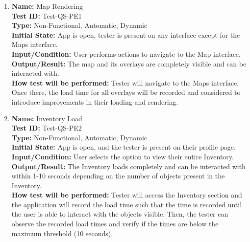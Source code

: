 \documentclass[12pt, titlepage]{article}
\begin{document}
\begin{enumerate}

  \item \textbf{Name:} Map Rendering \label{itm:Test-QS-PE1} \\
    \textbf{Test ID:} Test-QS-PE1 \\
    \textbf{Type:} Non-Functional, Automatic, Dynamic \\
    \textbf{Initial State:} App is open, tester is present on any interface except for the Maps interface. \\
    \textbf{Input/Condition:} User performs actions to navigate to the Map interface. \\
    \textbf{Output/Result:} The map and its overlays are completely visible and can be interacted with. \\
    \textbf{How test will be performed:} Tester will navigate to the Maps interface. Once there, the load time for all overlays will be recorded and considered to introduce improvements in their loading and rendering. \\

  \item \textbf{Name:} Inventory Load \label{itm:Test-QS-PE2} \\
    \textbf{Test ID:} Test-QS-PE2 \\
    \textbf{Type:} Non-Functional, Automatic, Dynamic \\
    \textbf{Initial State:} App is open, and the tester is present on their profile page. \\
    \textbf{Input/Condition:} User selects the option to view their entire Inventory. \\
    \textbf{Output/Result:} The Inventory loads completely and can be interacted with within 1-10 seconds depending on the number of objects present in the Inventory. \\
    \textbf{How test will be performed:} Tester will access the Inventory section and the application will record the load time such that the time is recorded until the user is able to interact with the objects visible. Then, the tester can observe the recorded load times and verify if the times are below the maximum threshold (10 seconds). \\


\end{enumerate}
\end{document}

